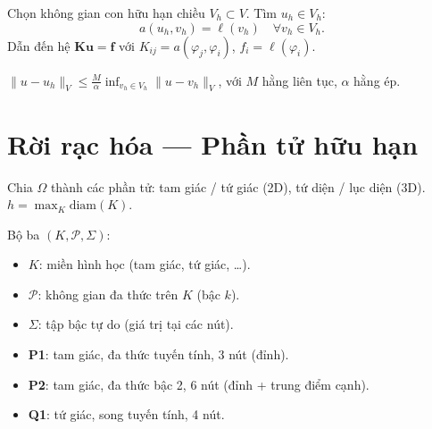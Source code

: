 \documentclass[12pt,a4paper]{article}
\begin{document}
\begin{dinhnghia}[title={Phương pháp Galerkin}]
  Chọn không gian con hữu hạn chiều $V_h \subset V$. Tìm $u_h \in V_h$:
  \[
    a(u_h, v_h) = \ell(v_h) \quad \forall v_h \in V_h.
  \]
  Dẫn đến hệ $\mathbf{K}\mathbf{u} = \mathbf{f}$ với $K_{ij} = a(\varphi_j, \varphi_i)$, $f_i = \ell(\varphi_i)$.
\end{dinhnghia}

\begin{dinhly}[title={Bổ đề Céa}]
  $\|u - u_h\|_V \le \frac{M}{\alpha}\inf_{v_h \in V_h}\|u - v_h\|_V$, với $M$ hằng liên tục, $\alpha$ hằng ép.
\end{dinhly}

\section{Rời rạc hóa --- Phần tử hữu hạn}

\begin{dinhnghia}[title={Lưới (Mesh)}]
  Chia $\Omega$ thành các phần tử: tam giác / tứ giác (2D), tứ diện / lục diện (3D). $h = \max_K \text{diam}(K)$.
\end{dinhnghia}

\begin{dinhnghia}[title={Phần tử hữu hạn Lagrange}]
  Bộ ba $(K, \mathcal{P}, \Sigma)$:
  \begin{itemize}
    \item $K$: miền hình học (tam giác, tứ giác, \ldots).
    \item $\mathcal{P}$: không gian đa thức trên $K$ (bậc $k$).
    \item $\Sigma$: tập bậc tự do (giá trị tại các nút).
  \end{itemize}
\end{dinhnghia}

\begin{tinhchat}[title={Phần tử phổ biến}]
  \begin{itemize}
    \item \textbf{P1}: tam giác, đa thức tuyến tính, 3 nút (đỉnh).
    \item \textbf{P2}: tam giác, đa thức bậc 2, 6 nút (đỉnh + trung điểm cạnh).
    \item \textbf{Q1}: tứ giác, song tuyến tính, 4 nút.
  \end{itemize}
\end{tinhchat}
\end{document}
